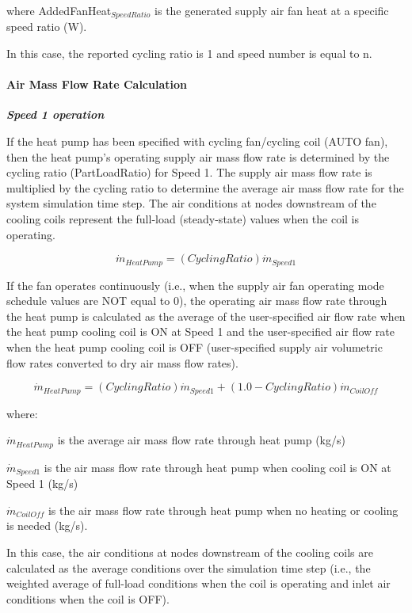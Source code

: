where AddedFanHeat\(_{SpeedRatio}\) is the generated supply air fan heat at a specific speed ratio (W).

In this case, the reported cycling ratio is 1 and speed number is equal to n.

\paragraph{Air Mass Flow Rate Calculation}\label{air-mass-flow-rate-calculation-2}

\emph{\textbf{Speed 1 operation}}

If the heat pump has been specified with cycling fan/cycling coil (AUTO fan), then the heat pump's operating supply air mass flow rate is determined by the cycling ratio (PartLoadRatio) for Speed 1. The supply air mass flow rate is multiplied by the cycling ratio to determine the average air mass flow rate for the system simulation time step. The air conditions at nodes downstream of the cooling coils represent the full-load (steady-state) values when the coil is operating.

\begin{equation}
{\dot m_{HeatPump}} = (CyclingRatio){\dot m_{Speed1}}
\end{equation}

If the fan operates continuously (i.e., when the supply air fan operating mode schedule values are NOT equal to 0), the operating air mass flow rate through the heat pump is calculated as the average of the user-specified air flow rate when the heat pump cooling coil is ON at Speed 1 and the user-specified air flow rate when the heat pump cooling coil is OFF (user-specified supply air volumetric flow rates converted to dry air mass flow rates).

\begin{equation}
{\dot m_{HeatPump}} = (CyclingRatio){\dot m_{Speed1}} + (1.0 - CyclingRatio){\dot m_{CoilOff}}
\end{equation}

where:

\({\dot m_{HeatPump}}\) is the average air mass flow rate through heat pump (kg/s)

\({{{\dot m}_{Speed1}}}\) is the air mass flow rate through heat pump when cooling coil is ON at Speed 1 (kg/s)

\({{{\dot m}_{CoilOff}}}\) is the air mass flow rate through heat pump when no heating or cooling is needed (kg/s).

In this case, the air conditions at nodes downstream of the cooling coils are calculated as the average conditions over the simulation time step (i.e., the weighted average of full-load conditions when the coil is operating and inlet air conditions when the coil is OFF).

